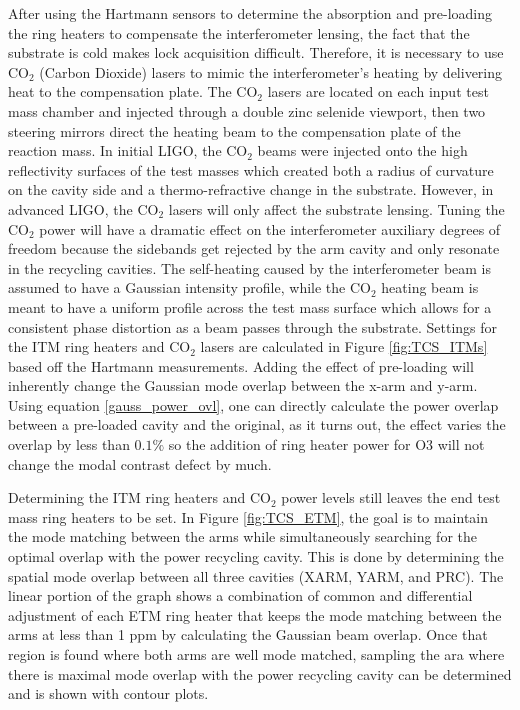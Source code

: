 	After using the Hartmann sensors to determine the absorption and pre-loading the ring heaters to compensate the interferometer lensing, the fact that the substrate is cold makes lock acquisition difficult.  Therefore, it is necessary to use CO$_2$ (Carbon Dioxide) lasers to mimic the interferometer's heating by delivering heat to the compensation plate.  The CO$_2$ lasers are located on each input test mass chamber and injected through a double zinc selenide viewport, then two steering mirrors direct the heating beam to the compensation plate of the reaction mass.  In initial LIGO, the CO$_2$ beams were injected onto the high reflectivity surfaces of the test masses which created both a radius of curvature on the cavity side and a thermo-refractive change in the substrate.  However, in advanced LIGO, the CO$_2$ lasers will only affect the substrate lensing.  Tuning the CO$_2$ power will have a dramatic effect on the interferometer auxiliary degrees of freedom because the sidebands get rejected by the arm cavity and only resonate in the recycling cavities.  The self-heating caused by the interferometer beam is assumed to have a Gaussian intensity profile, while the CO$_2$ heating beam is meant to have a uniform profile across the test mass surface which allows for a consistent phase distortion as a beam passes through the substrate.  Settings for the ITM ring heaters and CO$_2$ lasers are calculated in Figure \ref{fig:TCS_ITMs} based off the Hartmann measurements.  Adding the effect of pre-loading will inherently change the Gaussian mode overlap between the x-arm and y-arm.  Using equation \ref{gauss_power_ovl}, one can directly calculate the power overlap between a pre-loaded cavity and the original, as it turns out, the effect varies the overlap by less than $0.1\%$ so the addition of ring heater power for O3 will not change the modal contrast defect by much.
	
	Determining the ITM ring heaters and CO$_2$ power levels still leaves the end test mass ring heaters to be set.  In Figure \ref{fig:TCS_ETM}, the goal is to maintain the mode matching between the arms while simultaneously searching for the optimal overlap with the power recycling cavity.  This is done by determining the spatial mode overlap between all three cavities (XARM, YARM, and PRC). The linear portion of the graph shows a combination of common and differential adjustment of each ETM ring heater that keeps the mode matching between the arms at less than 1 ppm by calculating the Gaussian beam overlap.  Once that region is found where both arms are well mode matched, sampling the ara where there is maximal mode overlap with the power recycling cavity can be determined and is shown with contour plots. 
	
